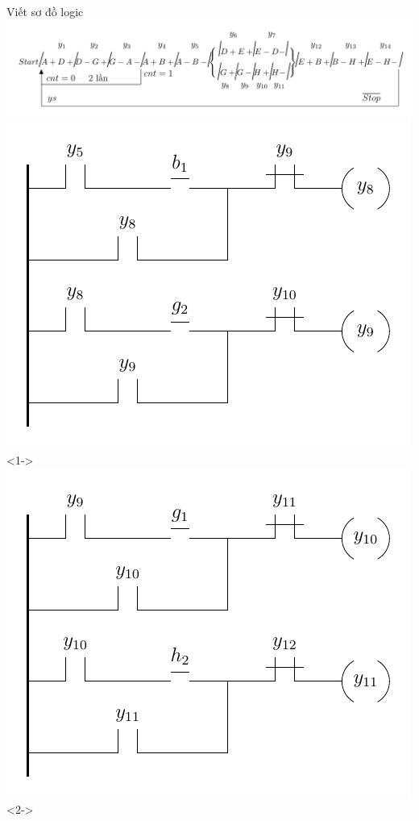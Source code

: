 \documentclass[24pt]{beamer}
\begin{document}
\begin{frame}[plain]{Viết sơ đồ logic}
	\vspace{-.5cm}
	\hspace{-1cm}\includegraphics[scale=0.7]{draw-tikz/quatrinh-bt4-buoc1-gomnhom.pdf}\\

	\includegraphics[scale=0.6]{draw-tikz/quatrinh-bt4-buoc2-sodologic-b5.pdf}<1->
	\hspace{0.5cm}\includegraphics[scale=0.6]{draw-tikz/quatrinh-bt4-buoc2-sodologic-b6.pdf}<2->
\end{frame}
\end{document}
